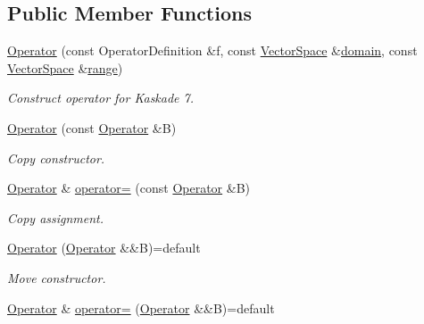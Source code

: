 \subsection*{Public Member Functions}
\begin{DoxyCompactItemize}
\item 
\hyperlink{classSpacy_1_1Kaskade_1_1Operator_ac3b217152eeed8b9f786732d300a024e_ac3b217152eeed8b9f786732d300a024e}{Operator} (const Operator\+Definition \&f, const \hyperlink{classSpacy_1_1VectorSpace}{Vector\+Space} \&\hyperlink{classSpacy_1_1OperatorBase_a2588f9b3e0188820c4c494e63293dc6f_a2588f9b3e0188820c4c494e63293dc6f}{domain}, const \hyperlink{classSpacy_1_1VectorSpace}{Vector\+Space} \&\hyperlink{classSpacy_1_1OperatorBase_ab19d3b7a6f290b1079248f1e567e53d6_ab19d3b7a6f290b1079248f1e567e53d6}{range})
\begin{DoxyCompactList}\small\item\em Construct operator for Kaskade 7. \end{DoxyCompactList}\item 
\hyperlink{classSpacy_1_1Kaskade_1_1Operator_a01164fcd2ea59f951312c37b39ee4f11_a01164fcd2ea59f951312c37b39ee4f11}{Operator} (const \hyperlink{classSpacy_1_1Kaskade_1_1Operator}{Operator} \&B)
\begin{DoxyCompactList}\small\item\em Copy constructor. \end{DoxyCompactList}\item 
\hyperlink{classSpacy_1_1Kaskade_1_1Operator}{Operator} \& \hyperlink{classSpacy_1_1Kaskade_1_1Operator_a18453c4bbf4040cc0534535ae0b0bbd9_a18453c4bbf4040cc0534535ae0b0bbd9}{operator=} (const \hyperlink{classSpacy_1_1Kaskade_1_1Operator}{Operator} \&B)
\begin{DoxyCompactList}\small\item\em Copy assignment. \end{DoxyCompactList}\item 
\hyperlink{classSpacy_1_1Kaskade_1_1Operator_abf7b871f49a8d6dde96c6ed7860820b0_abf7b871f49a8d6dde96c6ed7860820b0}{Operator} (\hyperlink{classSpacy_1_1Kaskade_1_1Operator}{Operator} \&\&B)=default
\begin{DoxyCompactList}\small\item\em Move constructor. \end{DoxyCompactList}\item 
\hyperlink{classSpacy_1_1Kaskade_1_1Operator}{Operator} \& \hyperlink{classSpacy_1_1Kaskade_1_1Operator_a5efe7986ca35ec405f4672ca04ac8349_a5efe7986ca35ec405f4672ca04ac8349}{operator=} (\hyperlink{classSpacy_1_1Kaskade_1_1Operator}{Operator} \&\&B)=default

\end{DoxyCompactItemize}
